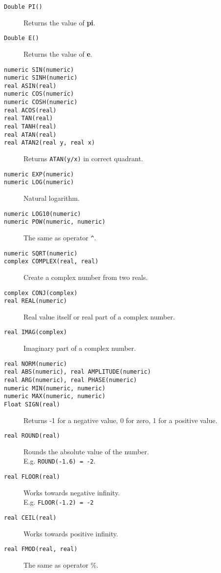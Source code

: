 \begin{description}
  \item[ \texttt{Double PI()}] Returns the value of \textbf{pi}.
  \item[ \texttt{Double E()}] Returns the value of \textbf{e}.
  \item[ \texttt{numeric SIN(numeric)}]
  \item[ \texttt{numeric SINH(numeric)}]
  \item[ \texttt{real ASIN(real)}]
  \item[ \texttt{numeric COS(numeric)}]
  \item[ \texttt{numeric COSH(numeric)}]
  \item[ \texttt{real ACOS(real)}]
  \item[ \texttt{real TAN(real)}]
  \item[ \texttt{real TANH(real)}]
  \item[ \texttt{real ATAN(real)}]
  \item[ \texttt{real ATAN2(real y, real x)}]
       Returns \texttt{ATAN(y/x)} in correct quadrant.
  \item[ \texttt{numeric EXP(numeric)}]
  \item[ \texttt{numeric LOG(numeric)}] Natural logarithm.
  \item[ \texttt{numeric LOG10(numeric)}]
  \item[ \texttt{numeric POW(numeric, numeric)}] The same as operator \verb+^+.
  \item[ \texttt{numeric SQRT(numeric)}]
  \item[ \texttt{complex COMPLEX(real, real)}]
       Create a complex number from two reals.
  \item[ \texttt{complex CONJ(complex)}]
  \item[ \texttt{real REAL(numeric)}] Real value itself or
    real part of a complex number.
  \item[ \texttt{real IMAG(complex)}] Imaginary part of a complex number.
  \item[ \texttt{real NORM(numeric)}]
  \item[ \texttt{real ABS(numeric),  real AMPLITUDE(numeric)}]
  \item[ \texttt{real ARG(numeric),  real PHASE(numeric)}]
  \item[ \texttt{numeric MIN(numeric, numeric)}]
  \item[ \texttt{numeric MAX(numeric, numeric)}]
  \item[ \texttt{Float SIGN(real)}]
       Returns -1 for a negative value, 0 for zero, 1 for a positive value.
  \item[ \texttt{real ROUND(real)}]
       Rounds the absolute value of the number.
       \\E.g. \texttt{ROUND(-1.6) = -2}.
  \item[ \texttt{real FLOOR(real)}]
       Works towards negative infinity.
       \\E.g. \texttt{FLOOR(-1.2) = -2}
  \item[ \texttt{real CEIL(real)}] Works towards positive infinity.
  \item[ \texttt{real FMOD(real, real)}] The same as operator \%.
\end{description}

